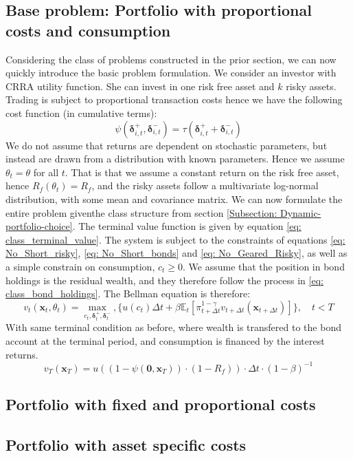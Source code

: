 \documentclass[11pt]{article}
\begin{document}
\subsection{Base problem: Portfolio with proportional costs and consumption}\label{Subsection: Base_Problem}
Considering the class of problems constructed in the prior section,
we can now quickly introduce the basic problem formulation.
We consider an investor with CRRA utility function. She can invest in one risk free asset and $k$ risky assets.
Trading is subject to proportional transaction costs hence we have the following cost function (in cumulative terms):
\begin{equation} \label{eq: base_model_transaction-cost}
  \psi (\boldsymbol{\delta}^{+}_{i,t}, \boldsymbol{\delta}^{-}_{i,t} ) = \tau (\boldsymbol{\delta}^{+}_{i,t} + \boldsymbol{\delta}^{-}_{i,t}) 
\end{equation}
We do not assume that returns are dependent on stochastic parameters, but instead are drawn from a distribution with known parameters.
Hence we assume \( \theta_{t} = \theta \) for all $t$. That is that we assume a constant return on the risk free asset, hence $R_{f}(\theta_t) = R_{f}$,
and the risky assets follow a multivariate log-normal distribution, with some mean and covariance matrix.
We can now formulate the entire problem giventhe class structure from section \ref{Subsection: Dynamic-portfolio-choice}.
The terminal value function is given by equation \eqref{eq: class_terminal_value}. 
The system is subject to the constraints of equations \eqref{eq: No_Short_risky}, \eqref{eq: No_Short_bonds} and \eqref{eq: No_Geared_Risky},
as well as a simple constrain on consumption, $c_t \geq 0$.
We assume that the position in bond holdings is the residual wealth, and they therefore follow the process
in \eqref{eq: class_bond_holdings}. The Bellman equation is therefore:
\[  
  v_{t} (\mathbf{x}_{t}, \theta_t) = \max_{c_t , \boldsymbol{\delta}^{+}_{t}, \boldsymbol{\delta}^{-}_{t}  },  \{ u(c_t) 
  \Delta t + \beta \mathbb{E}_{t} \left[ 
    \pi_{t+\Delta t}^{1-\gamma}
    v_{t+\Delta t} (\mathbf{x}_{t+\Delta t }) 
    \right] \} , \quad t < T 
\]
With same terminal condition as before, where wealth is transfered to the bond account at the terminal period, 
and consumption is financed by the interest returns.
\[
  v_T (\mathbf{x}_T) = u ( (1 - \psi( \mathbf{0},\mathbf{x}_T)) \cdot (1-R_f) )\cdot \Delta t \cdot (1-\beta)^{-1} 
\]

\subsection{Portfolio with fixed and proportional costs}
\subsection{Portfolio with asset specific costs}

\ifdefined\COMPILINGMAIN
\else
\printbibliography
\end{document}
